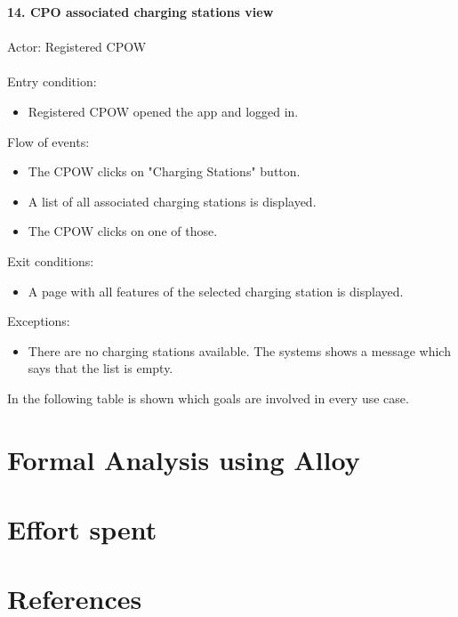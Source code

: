 \documentclass[a4paper]{report}
\begin{document}
\textbf{14. CPO associated charging stations view}\label{uc:8}
\\ \\
Actor: Registered CPOW \\ \\
Entry condition: 
\begin{itemize}
\item Registered CPOW opened the app and logged in.
\end{itemize}
Flow of events:
\begin{itemize}
\item The CPOW clicks on "Charging Stations" button.
\item A list of all associated charging stations is displayed.
\item The CPOW clicks on one of those.
\end{itemize}
Exit conditions: 
\begin{itemize}
\item A page with all features of the selected charging station is displayed.
\end{itemize} 
Exceptions: 
\begin{itemize}
\item There are no charging stations available. The systems shows a message which says that the list is empty.
\end{itemize}
In the following table is shown which goals are involved in every use case.

\chapter{Formal Analysis using Alloy}

\chapter{Effort spent}


\chapter{References}
\end{document}
